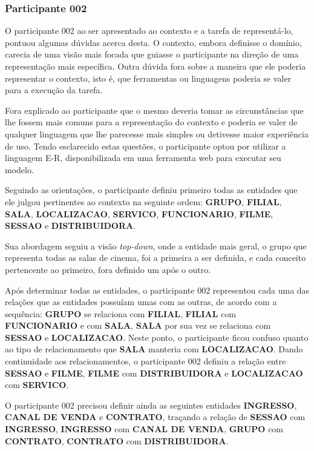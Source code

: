 \subsubsection{\hspace*{3pt} Participante 002}
\label{sec:participante_002}

O participante 002 ao ser apresentado ao contexto e a tarefa de representá-lo, pontuou algumas dúvidas acerca desta. O contexto, embora definisse o domínio, carecia de uma visão mais focada que guiasse o participante na direção de uma representação mais específica. Outra dúvida fora sobre a maneira que ele poderia representar o contexto, isto é, que ferramentas ou linguagens poderia se valer para a execução da tarefa.

Fora explicado ao participante que o mesmo deveria tomar as circunstâncias que lhe fossem mais comuns para a representação do contexto e poderia se valer de qualquer linguagem que lhe parecesse mais simples ou detivesse maior experiência de uso. Tendo esclarecido estas questões, o participante optou por utilizar a linguagem E-R, disponibilizada em uma ferramenta web para executar seu modelo.

Seguindo as orientações, o participante definiu primeiro todas as entidades que ele julgou pertinentes ao contexto na seguinte ordem: \textbf{GRUPO}, \textbf{FILIAL}, \textbf{SALA}, \textbf{LOCALIZACAO}, \textbf{SERVICO}, \textbf{FUNCIONARIO}, \textbf{FILME}, \textbf{SESSAO} e \textbf{DISTRIBUIDORA}.

Sua abordagem seguiu a visão \textit{top-down}, onde a entidade mais geral, o grupo que representa todas as salas de cinema, foi a primeira a ser definida, e cada conceito pertencente ao primeiro, fora definido um após o outro.

Após determinar todas as entidades, o participante 002 representou cada uma das relações que as entidades possuíam umas com as outras, de acordo com a sequência: \textbf{GRUPO} se relaciona com \textbf{FILIAL}, \textbf{FILIAL} com \textbf{FUNCIONARIO} e com \textbf{SALA}, \textbf{SALA} por sua vez se relaciona com \textbf{SESSAO} e \textbf{LOCALIZACAO}. Neste ponto, o participante ficou confuso quanto ao tipo de relacionamento que \textbf{SALA} manteria com \textbf{LOCALIZACAO}. Dando continuidade aos relacionamentos, o participante 002 definiu a relação entre \textbf{SESSAO} e \textbf{FILME}, \textbf{FILME} com \textbf{DISTRIBUIDORA} e \textbf{LOCALIZACAO} com \textbf{SERVICO}. 

O participante 002 precisou definir ainda as seguintes entidades \textbf{INGRESSO},  \textbf{CANAL DE VENDA} e \textbf{CONTRATO}, traçando a relação de \textbf{SESSAO} com \textbf{INGRESSO}, \textbf{INGRESSO} com \textbf{CANAL DE VENDA}, \textbf{GRUPO} com \textbf{CONTRATO}, \textbf{CONTRATO} com \textbf{DISTRIBUIDORA}.

